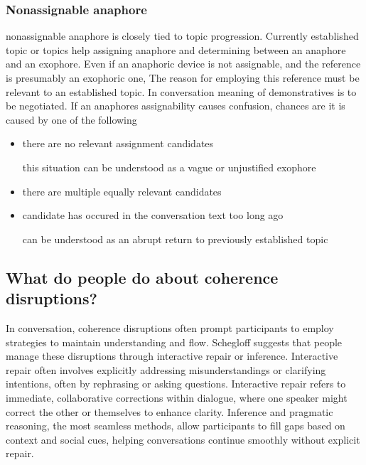 \documentclass[12pt]{report}
\begin{document}
{\subsubsection{Nonassignable anaphore}
\par
    nonassignable anaphore is closely tied to topic progression.
    Currently established topic or topics help assigning anaphore and
    determining between an anaphore and an exophore.
    Even if an anaphoric device is not assignable,
    and the reference is presumably an exophoric one,
    The reason for employing this reference must be
    relevant to an established topic.
    In conversation meaning of demonstratives is to be negotiated.
    If an anaphores assignability causes confusion,
    chances are it is caused by one of the following

\begin{itemize}
\item
there are no relevant assignment candidates

    \quad
    this situation can be understood as a vague or unjustified exophore

\item
there are multiple equally relevant candidates

\item
candidate has occured in the conversation text too long ago

    \quad
    can be understood as an abrupt return to previously established topic
\end{itemize}

\subsection{What do people do about coherence disruptions?}
\par
In conversation, coherence disruptions often prompt participants to
employ strategies to maintain understanding and flow.
Schegloff suggests that people manage these disruptions through interactive repair or inference.
Interactive repair often involves
explicitly addressing misunderstandings or clarifying intentions,
often by rephrasing or asking questions.
Interactive repair refers to immediate, collaborative corrections within dialogue,
where one speaker might correct the other or themselves to enhance clarity.
Inference and pragmatic reasoning, the most seamless methods,
allow participants to fill gaps based on context and social cues,
helping conversations continue smoothly without explicit repair.

}
\end{document}
